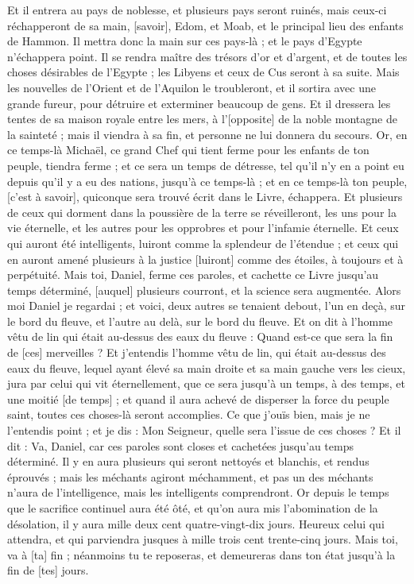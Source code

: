 \begin{multicols}{2}
Et il entrera au pays de noblesse, et plusieurs pays seront ruinés, mais ceux-ci réchapperont de sa main, [savoir], Edom, et Moab, et le principal lieu des enfants de Hammon.
Il mettra donc la main sur ces pays-là ; et le pays d'Egypte n'échappera point.
Il se rendra maître des trésors d'or et d'argent, et de toutes les choses désirables de l'Egypte ; les Libyens et ceux de Cus seront à sa suite.
Mais les nouvelles de l'Orient et de l'Aquilon le troubleront, et il sortira avec une grande fureur, pour détruire et exterminer beaucoup de gens.
Et il dressera les tentes de sa maison royale entre les mers, à l'[opposite] de la noble montagne de la sainteté ; mais il viendra à sa fin, et personne ne lui donnera du secours.
\VerseOne{}Or, en ce temps-là Michaël, ce grand Chef qui tient ferme pour les enfants de ton peuple, tiendra ferme ; et ce sera un temps de détresse, tel qu'il n'y en a point eu depuis qu'il y a eu des nations, jusqu'à ce temps-là ; et en ce temps-là ton peuple, [c'est à savoir], quiconque sera trouvé écrit dans le Livre, échappera.
Et plusieurs de ceux qui dorment dans la poussière de la terre se réveilleront, les uns pour la vie éternelle, et les autres pour les opprobres et pour l'infamie éternelle.
Et ceux qui auront été intelligents, luiront comme la splendeur de l'étendue ; et ceux qui en auront amené plusieurs à la justice [luiront] comme des étoiles, à toujours et à perpétuité.
Mais toi, Daniel, ferme ces paroles, et cachette ce Livre jusqu'au temps déterminé, [auquel] plusieurs courront, et la science sera augmentée.
Alors moi Daniel je regardai ; et voici, deux autres se tenaient debout, l'un en deçà, sur le bord du fleuve, et l'autre au delà, sur le bord du fleuve.
Et on dit à l'homme vêtu de lin qui était au-dessus des eaux du fleuve : Quand est-ce que sera la fin de [ces] merveilles ?
Et j'entendis l'homme vêtu de lin, qui était au-dessus des eaux du fleuve, lequel ayant élevé sa main droite et sa main gauche vers les cieux, jura par celui qui vit éternellement, que ce sera jusqu'à un temps, à des temps, et une moitié [de temps] ; et quand il aura achevé de disperser la force du peuple saint, toutes ces choses-là seront accomplies.
Ce que j'ouïs bien, mais je ne l'entendis point ; et je dis : Mon Seigneur, quelle sera l'issue de ces choses ?
Et il dit : Va, Daniel, car ces paroles sont closes et cachetées jusqu'au temps déterminé.
Il y en aura plusieurs qui seront nettoyés et blanchis, et rendus éprouvés ; mais les méchants agiront méchamment, et pas un des méchants n'aura de l'intelligence, mais les intelligents comprendront.
Or depuis le temps que le sacrifice continuel aura été ôté, et qu'on aura mis l'abomination de la désolation, il y aura mille deux cent quatre-vingt-dix jours.
Heureux celui qui attendra, et qui parviendra jusques à mille trois cent trente-cinq jours.
Mais toi, va à [ta] fin ; néanmoins tu te reposeras, et demeureras dans ton état jusqu'à la fin de [tes] jours.
\PPE{}
\end{multicols}
